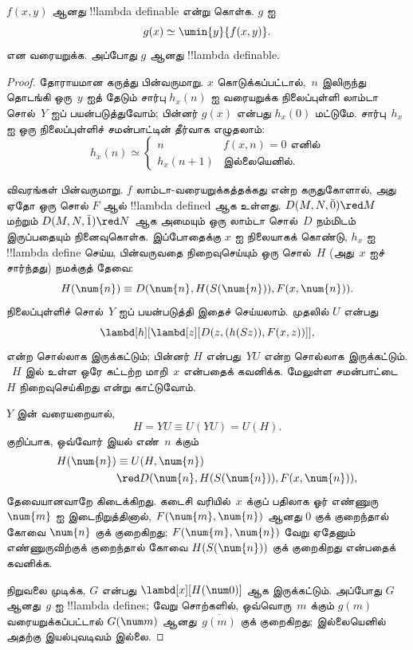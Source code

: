 \documentclass[../../../include/open-logic-section]{subfiles}
\begin{document}

\begin{lem}
$f(x,y)$ ஆனது !!{lambda definable} என்று கொள்க. $g$ ஐ
\[
g(x) \simeq \umin{y}{f(x,y)}.
\]
என வரையறுக்க. அப்போது $g$ ஆனது !!{lambda definable}.
\end{lem}

\begin{proof}
தோராயமான கருத்து பின்வருமாறு. $x$ கொடுக்கப்பட்டால்,~$n$ இலிருந்து தொடங்கி
ஒரு~$y$ ஐத் தேடும் சார்பு $h_x(n)$ ஐ வரையறுக்க நிலைப்புள்ளி லாம்டா
சொல்~$Y$ ஐப் பயன்படுத்துவோம்; பின்னர் $g(x)$ என்பது $h_x(0)$ மட்டுமே.
சார்பு~$h_x$ ஐ ஒரு நிலைப்புள்ளிச் சமன்பாட்டின் தீர்வாக எழுதலாம்:
\[
h_x(n) \simeq
\begin{cases}
n & \text{$f(x,n) = 0$ எனில்} \\
h_x(n+1) & \text{இல்லையெனில்.}
\end{cases}
\]

விவரங்கள் பின்வருமாறு. $f$ லாம்டா-வரையறுக்கத்தக்கது என்ற கருதுகோளால்,
அது ஏதோ ஒரு சொல் $F$ ஆல் !!{lambda defined} ஆக உள்ளது. $D(M, N, \bar{0})
\red M$ மற்றும் $D(M, N, \bar{1}) \red N$ ஆக அமையும் ஒரு லாம்டா சொல்~$D$
நம்மிடம் இருப்பதையும் நினைவுகொள்க. இப்போதைக்கு $x$ ஐ நிலையாகக் கொண்டு,
$h_x$ ஐ !!{lambda define} செய்ய, பின்வருவதை நிறைவுசெய்யும் ஒரு சொல்~$H$
(அது~$x$ ஐச் சார்ந்தது) நமக்குத் தேவை:
\[
H(\num{n}) \equiv D(\num{n}, H(S(\num{n})), F(x, \num{n})).
\]
நிலைப்புள்ளிச் சொல்~$Y$ ஐப் பயன்படுத்தி இதைச் செய்யலாம். முதலில் $U$ என்பது
\[
\lambd[h][\lambd[z][D(z,(h(Sz)),F(x,z))]],
\]
என்ற சொல்லாக இருக்கட்டும்; பின்னர் $H$ என்பது~$YU$ என்ற சொல்லாக இருக்கட்டும்.
~$H$ இல் உள்ள ஒரே கட்டற்ற மாறி~$x$ என்பதைக் கவனிக்க. மேலுள்ள சமன்பாட்டை
$H$ நிறைவுசெய்கிறது என்று காட்டுவோம்.

$Y$ இன் வரையறையால்,
\[
H = YU \equiv U(YU) = U(H).
\]
குறிப்பாக, ஒவ்வோர் இயல் எண்~$n$ க்கும்
\begin{align*}
H(\num{n}) & \equiv U(H, \num{n}) \\
& \red D(\num{n}, H(S(\num{n})), F(x, \num{n})),
\end{align*}
தேவையானவாறே கிடைக்கிறது. கடைசி வரியில்~$x$ க்குப் பதிலாக ஓர் எண்ணுரு
$\num{m}$ ஐ இடைநிறுத்தினால், $F(\num{m}, \num{n})$ ஆனது $\num{0}$ குக்
குறைந்தால் கோவை $\num{n}$ குக் குறைகிறது; $F(\num{m}, \num{n})$ வேறு
ஏதேனும் எண்ணுருவிற்குக்
குறைந்தால் கோவை $H(S(\num{n}))$ குக் குறைகிறது என்பதைக் கவனிக்க.

நிறுவலை முடிக்க, $G$ என்பது $\lambd[x][H(\num 0)]$ ஆக இருக்கட்டும். அப்போது
$G$ ஆனது~$g$ ஐ !!{lambda define}s; வேறு சொற்களில், ஒவ்வொரு~$m$ க்கும்
$g(m)$ வரையறுக்கப்பட்டால் $G(\num m)$ ஆனது~$\overline {g(m)}$ குக் குறைகிறது;
இல்லையெனில் அதற்கு இயல்புவடிவம் இல்லை.
\end{proof}
\end{document}
